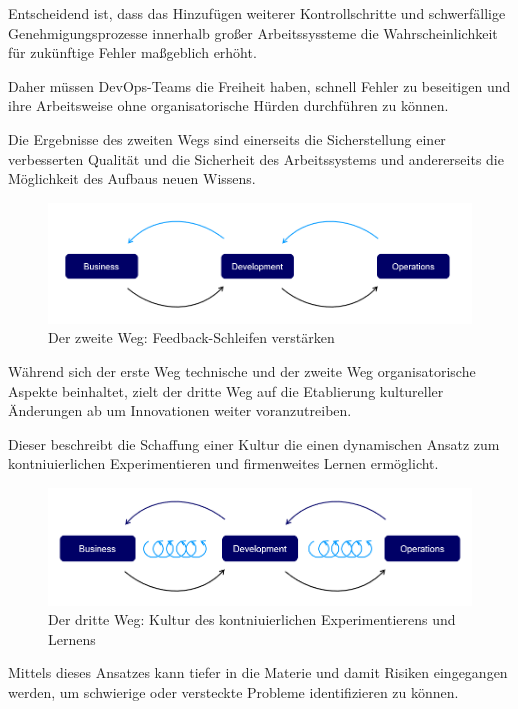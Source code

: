 Entscheidend ist, dass das Hinzufügen weiterer Kontrollschritte und schwerfällige Genehmigungsprozesse innerhalb großer Arbeitssyssteme die Wahrscheinlichkeit für zukünftige Fehler maßgeblich erhöht. \cite[S. 31]{kim_devops-handbuch_2017} 

Daher müssen DevOps-Teams die Freiheit haben, schnell Fehler zu beseitigen und ihre Arbeitsweise ohne organisatorische Hürden durchführen zu können.   

Die Ergebnisse des zweiten Wegs sind einerseits die Sicherstellung einer verbesserten Qualität und die Sicherheit des Arbeitssystems und andererseits die Möglichkeit des Aufbaus neuen Wissens.

\begin{figure}[h]
    \centering
    \includegraphics[scale=0.6]{Bilder/Second Way.png}
    \caption{Der zweite Weg: Feedback-Schleifen verstärken \cite{kim_three_2012}}
\end{figure}

Während sich der erste Weg technische und der zweite Weg organisatorische Aspekte beinhaltet, zielt der dritte Weg auf die Etablierung kultureller Änderungen ab um Innovationen weiter voranzutreiben. 

Dieser beschreibt die Schaffung einer Kultur die einen dynamischen Ansatz zum kontniuierlichen Experimentieren und firmenweites Lernen ermöglicht. 

\begin{figure}[h]
    \centering
    \includegraphics[scale=0.6]{Bilder/Third Way.png}
    \caption{Der dritte Weg: Kultur des kontniuierlichen Experimentierens und Lernens \cite{kim_three_2012}}
\end{figure}

Mittels dieses Ansatzes kann tiefer in die Materie und damit Risiken eingegangen werden, um schwierige oder versteckte Probleme identifizieren zu können. 

